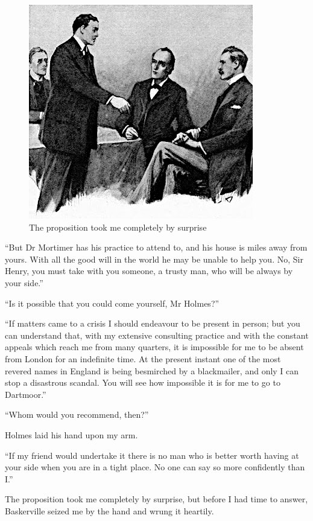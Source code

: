 \documentclass[paper=a5,BCOR=7mm,twoside,DIV=calc,12pt,usegeometry,openany,chapterprefix,endperiod,headings=big]{scrbook} %
\begin{document}
\begin{figure}[t!h]
\centering
\includegraphics[width=.8\linewidth]{05_proposition}
\caption{The proposition took me completely by surprise}
\end{figure}

\enquote{But Dr Mortimer has his practice to attend to, and his house is miles away from yours. With all the good will in the world he may be unable to help you. No, Sir Henry, you must take with you someone, a trusty man, who will be always by your side.}

\enquote{Is it possible that you could come yourself, Mr Holmes?}

\enquote{If matters came to a crisis I should endeavour to be present in person; but you can understand that, with my extensive consulting practice and with the constant appeals which reach me from many quarters, it is impossible for me to be absent from London for an indefinite time. At the present instant one of the most revered names in England is being besmirched by a blackmailer, and only I can stop a disastrous scandal. You will see how impossible it is for me to go to Dartmoor.}

\enquote{Whom would you recommend, then?}

Holmes laid his hand upon my arm.

\enquote{If my friend would undertake it there is no man who is better worth having at your side when you are in a tight place. No one can say so more confidently than I.}

The proposition took me completely by surprise, but before I had time to answer, Baskerville seized me by the hand and wrung it heartily.
\end{document}
